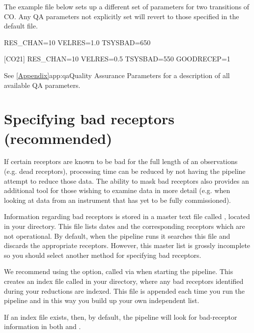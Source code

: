 \documentclass[11pt,oneside,chapters]{starlink}
\begin{document}
The example file below sets up a different set of parameters for two
transitions of CO. Any QA parameters not explicitly set will revert to
those specified in the default  file.

\vspace{0.2cm}
\begin{terminalv}
[C18O32]
RES_CHAN=10
VELRES=1.0
TSYSBAD=650

[CO21]
RES_CHAN=10
VELRES=0.5
TSYSBAD=550
GOODRECEP=1
\end{terminalv}

See \cref{Appendix}{app:qa}{Quality Assurance Parameters} for a
description of all available QA parameters.


\section{Specifying bad receptors (recommended)}
\label{sec:badrec}

If certain receptors are known to be bad for the full length of an
observations (e.g. dead receptors), processing time can be reduced by
not having the pipeline attempt to reduce those data. The ability to
mask bad receptors also provides an additional tool for those wishing
to examine data in more detail (e.g. when looking at data from an
instrument that has yet to be fully commissioned).

Information regarding bad receptors is stored in a master text file
called , located in your
 directory. This file lists dates and the
corresponding receptors which are not operational. By default, when
the pipeline runs it searches this file and discards the appropriate
receptors. However, this master list is grossly incomplete so you
should select another method for specifying bad receptors.

We recommend using the  option, called via  when starting the pipeline. This creates an
index file called  in your
 directory, where any bad receptors identified
during your reductions are indexed. This file is appended each time
you run the pipeline and in this way you build up your own independent
list.

If an index file exists, then, by default, the pipeline will look for
bad-receptor information in both
 and
.
\end{document}
